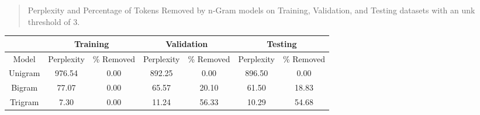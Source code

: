 \begin{quote}
    Perplexity and Percentage of Tokens Removed by n-Gram models on Training, Validation, and Testing datasets with an unk threshold of 3.
\end{quote}
\begin{center}
    \begin{tabular}{ |c|c|c|c|c|c|c| } 
	\hline
	 & \multicolumn{2}{c|}{Training} & \multicolumn{2}{c|}{Validation} & \multicolumn{2}{c|}{Testing} \\ 
	\hline
	Model & Perplexity & \% Removed & Perplexity & \% Removed & Perplexity & \% Removed \\
	\hline
	Unigram & 976.54 & 0.00 & 892.25 & 0.00 & 896.50 & 0.00 \\ 
	\hline
	Bigram & 77.07 & 0.00 & 65.57 & 20.10 & 61.50 & 18.83 \\ 
	\hline
	Trigram & 7.30 & 0.00 & 11.24 & 56.33 & 10.29 & 54.68 \\ 
	\hline
    \end{tabular}
\end{center}
